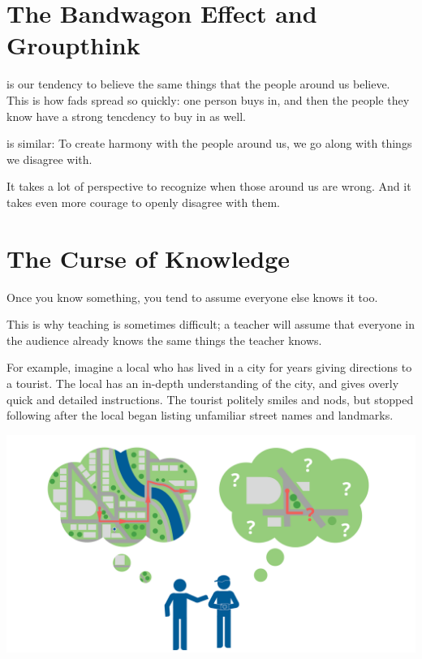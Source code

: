 \section{The Bandwagon Effect and Groupthink}

 is our tendency to believe the same
things that the people around us believe. This is how fads spread so
quickly: one person buys in, and then the people they know have a
strong tencdency to buy in as well.

 is similar: To create harmony with the
people around us, we go along with things we disagree with.

It takes a lot of perspective to recognize when those around us are
wrong. And it takes even more courage to openly disagree with them.


\section{The Curse of Knowledge}

Once you know something, you tend to assume everyone else knows it too.

This is why teaching is sometimes difficult; a teacher will assume
that everyone in the audience already knows the same things the
teacher knows.

For example, imagine a local who has lived in a city for years giving directions to a tourist. 
The local has an in-depth understanding of the city, and gives overly quick and detailed instructions. The tourist politely smiles and nods, but stopped following after the local began listing unfamiliar street names and landmarks. 

\includegraphics[width=1\textwidth]{curseOfKnowledge.png}

